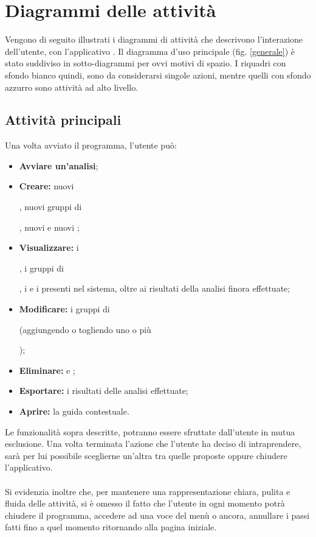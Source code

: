 \section{Diagrammi delle attività}
\label{diagrammiAtt}
Vengono di seguito illustrati i diagrammi di attività che descrivono l'interazione dell'utente, con l'applicativo \project{}. Il diagramma d'uso principale (fig. \ref{generale}) è stato suddiviso in sotto-diagrammi per ovvi motivi di spazio. I riquadri con sfondo bianco quindi, sono da considerarsi singole azioni, mentre quelli con sfondo azzurro sono attività ad alto livello.

\subsection{Attività principali}
\label{principle}
Una volta avviato il programma, l'utente può:
\begin{itemize}
\item\textbf{Avviare un'analisi};
\item\textbf{Creare:} nuovi \subject{}, nuovi gruppi di \subject{}, nuovi \protocol{} e nuovi \dataset{};
\item\textbf{Visualizzare:} i \subject{}, i gruppi di \subject{}, i \protocol{} e i \dataset{} presenti nel sistema, oltre ai risultati della analisi finora effettuate;
\item\textbf{Modificare:} i gruppi di \subject{} (aggiungendo o togliendo uno o più \subject{});
\item\textbf{Eliminare:} \protocol{} e \dataset{};
\item\textbf{Esportare:} i risultati delle analisi effettuate;
\item\textbf{Aprire:} la guida contestuale.
\end{itemize}
Le funzionalità sopra descritte, potranno essere sfruttate dall'utente in mutua esclusione. Una volta terminata l'azione che l'utente ha deciso di intraprendere, sarà per lui possibile sceglierne un'altra tra quelle proposte oppure chiudere l'applicativo.
\\
\\
Si evidenzia inoltre che, per mantenere una rappresentazione chiara, pulita e fluida delle attività, si è omesso il fatto che l'utente in ogni momento potrà chiudere il programma, accedere ad una voce del menù o ancora, annullare i passi fatti fino a quel momento ritornando alla pagina iniziale.
\pagebreak

